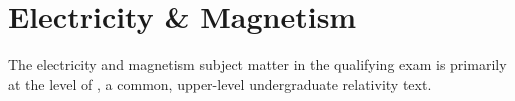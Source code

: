 \newpage
\section{Electricity \& Magnetism}
\label{sec:electro}
The electricity and magnetism subject matter in the qualifying exam is primarily at the level of \cite{griffithsIntroductionElectrodynamics2018}, a common, upper-level undergraduate relativity text.

